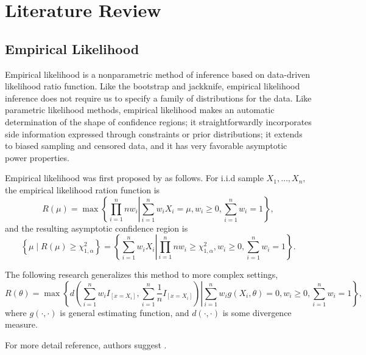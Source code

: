 \chapter{Literature Review}

\section{Empirical Likelihood}

Empirical likelihood is a nonparametric method of inference based
on data-driven likelihood ratio function. Like the bootstrap and jackknife,
empirical likelihood inference does not require us to specify a family
of distributions for the data. Like parametric likelihood methods,
empirical likelihood makes an automatic determination of the shape
of confidence regions; it straightforwardly incorporates side information
expressed through constraints or prior distributions; it extends to
biased sampling and censored data, and it has very favorable asymptotic
power properties.

Empirical likelihood was first proposed by \citet{owen1988empirical}
as follows. For i.i.d sample $X_{1},\ldots,X_{n},$ the empirical
likelihood ration function is 
\[
R\left(\mu\right)=\max\left\{ \left.\prod_{i=1}^{n}nw_{i}\right|\sum_{i=1}^{n}w_{i}X_{i}=\mu,w_{i}\ge0,\sum_{i=1}^{n}w_{i}=1\right\} ,
\]
and the resulting asymptotic confidence region is 
\begin{equation}
\left\{ \mu\mid R\left(\mu\right)\ge\chi_{1,\alpha}^{2}\right\} =\left\{ \left.\sum_{i=1}^{n}w_{i}X_{i}\right|\prod_{i=1}^{n}nw_{i}\ge\chi_{1,\alpha}^{2},w_{i}\ge0,\sum_{i=1}^{n}w_{i}=1\right\} .\label{eq:ci-original-el}
\end{equation}
\begin{comment}
rubin 1981 bayesian bootstrap in wu changbao. ? lit review asymp exp
obj prior. 
\end{comment}
The following research generalizes this method to more complex settings,
\[
R\left(\theta\right)=\max\left\{ \left.d\left(\sum_{i=1}^{n}w_{i}I_{\left[x=X_{i}\right]},\sum_{i=1}^{n}\frac{1}{n}I_{\left[x=X_{i}\right]}\right)\right|\sum_{i=1}^{n}w_{i}g\left(X_{i},\theta\right)=0,w_{i}\ge0,\sum_{i=1}^{n}w_{i}=1\right\} ,
\]
where $g\left(\cdot,\cdot\right)$ is general estimating function,
and $d\left(\cdot,\cdot\right)$ is some divergence measure.%
\begin{comment}
prob cov ch2 ch3
\end{comment}
{} For more detail reference, authors suggest \citet{owen2010empirical}.


